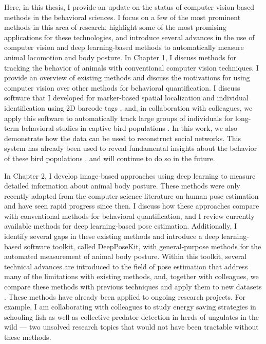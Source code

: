 Here, in this thesis, I provide an update on the status of computer vision-based methods in the behavioral sciences. I focus on a few of the most prominent methods in this area of research, highlight some of the most promising applications for these technologies, and introduce several advances in the use of computer vision and deep learning-based methods to automatically measure animal locomotion and body posture. In Chapter 1, I discuss methods for tracking the behavior of animals with conventional computer vision techniques. I provide an overview of existing methods and discuss the motivations for using computer vision over other methods for behavioral quantification. I discuss software that I developed for marker-based spatial localization and individual identification using 2D barcode tags \citep{graving2017pinpoint}, and, in collaboration with colleagues, we apply this software to automatically track large groups of individuals for long-term behavioral studies in captive bird populations \citep{alarcon2018automated}. In this work, we also demonstrate how the data can be used to reconstruct social networks. This system has already been used to reveal fundamental insights about the behavior of these bird populations \citep{maldonado2018experimental}, and will continue to do so in the future. 

In Chapter 2, I develop image-based approaches using deep learning to measure detailed information about animal body posture. These methods were only recently adapted from the computer science literature on human pose estimation and have seen rapid progress since then. I discuss how these approaches compare with conventional methods for behavioral quantification, and I review currently available methods for deep learning-based pose estimation. Additionally, I identify several gaps in these existing methods and introduce a deep learning-based software toolkit, called DeepPoseKit, with general-purpose methods for the automated measurement of animal body posture. Within this toolkit, several technical advances are introduced to the field of pose estimation that address many of the limitations with existing methods, and, together with colleagues, we compare these methods with previous techniques and apply them to new datasets \citep{graving2019deepposekit}. These methods have already been applied to ongoing research projects. For example, I am collaborating with colleagues to study energy saving strategies in schooling fish as well as collective predator detection in herds of ungulates in the wild --- two unsolved research topics that would not have been tractable without these methods.

